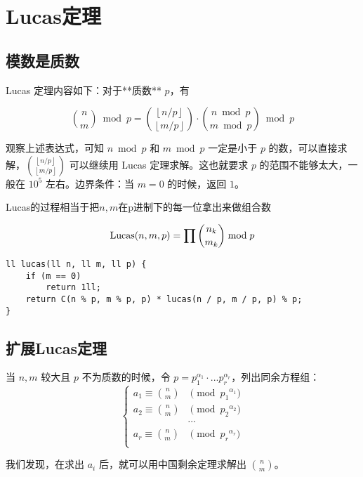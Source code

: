 \section{Lucas定理}
\subsection{模数是质数}
\par \noindent Lucas 定理内容如下：对于**质数** $p$，有

$$
\binom{n}{m}\bmod p = \binom{\left\lfloor n/p \right\rfloor}{\left\lfloor m/p\right\rfloor}\cdot\binom{n\bmod p}{m\bmod p}\bmod p
$$

\par \noindent 观察上述表达式，可知 $n\bmod p$ 和 $m\bmod p$ 一定是小于 $p$ 的数，可以直接求解，$\displaystyle\binom{\left\lfloor n/p \right\rfloor}{\left\lfloor m/p\right\rfloor}$ 可以继续用 Lucas 定理求解。这也就要求 $p$ 的范围不能够太大，一般在 $10^5$ 左右。边界条件：当 $m=0$ 的时候，返回 $1$。

\par \noindent Lucas的过程相当于把$n,m$在p进制下的每一位拿出来做组合数

$$
\text{Lucas}(n,m,p)=\prod \dbinom {n_k}{m_k} \bmod p
$$

\begin{verbatim}
ll lucas(ll n, ll m, ll p) {
    if (m == 0)
        return 1ll;
    return C(n % p, m % p, p) * lucas(n / p, m / p, p) % p;
}
\end{verbatim}

\subsection{扩展Lucas定理}
\par \noindent 当 $n, m$ 较大且 $p$ 不为质数的时候，令 $p = p_1^{\alpha_1} \cdot ... p_r^{\alpha_r}$，列出同余方程组：
$$
\begin{cases}
a_1\equiv \displaystyle\binom{n}{m}&\pmod {{p_1}^{\alpha_1}}\\
a_2\equiv \displaystyle\binom{n}{m}&\pmod {{p_2}^{\alpha_2}}\\
&\cdots\\
a_r\equiv \displaystyle\binom{n}{m}&\pmod {{p_r}^{\alpha_r}}\\
\end{cases}
$$
\par \noindent 我们发现，在求出 $a_i$ 后，就可以用中国剩余定理求解出 $\binom{n}{m}$。


